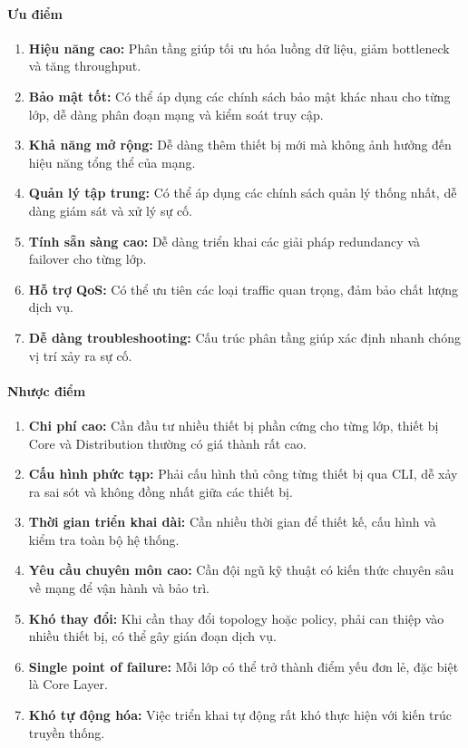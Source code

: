 \paragraph{Ưu điểm}
\begin{enumerate}
    \item \textbf{Hiệu năng cao:} Phân tầng giúp tối ưu hóa luồng dữ liệu, giảm bottleneck và tăng throughput.
    \item \textbf{Bảo mật tốt:} Có thể áp dụng các chính sách bảo mật khác nhau cho từng lớp, dễ dàng phân đoạn mạng và kiểm soát truy cập.
    \item \textbf{Khả năng mở rộng:} Dễ dàng thêm thiết bị mới mà không ảnh hưởng đến hiệu năng tổng thể của mạng.
    \item \textbf{Quản lý tập trung:} Có thể áp dụng các chính sách quản lý thống nhất, dễ dàng giám sát và xử lý sự cố.
    \item \textbf{Tính sẵn sàng cao:} Dễ dàng triển khai các giải pháp redundancy và failover cho từng lớp.
    \item \textbf{Hỗ trợ QoS:} Có thể ưu tiên các loại traffic quan trọng, đảm bảo chất lượng dịch vụ.
    \item \textbf{Dễ dàng troubleshooting:} Cấu trúc phân tầng giúp xác định nhanh chóng vị trí xảy ra sự cố.
\end{enumerate}

\paragraph{Nhược điểm}
\begin{enumerate}
    \item \textbf{Chi phí cao:} Cần đầu tư nhiều thiết bị phần cứng cho từng lớp, thiết bị Core và Distribution thường có giá thành rất cao.
    \item \textbf{Cấu hình phức tạp:} Phải cấu hình thủ công từng thiết bị qua CLI, dễ xảy ra sai sót và không đồng nhất giữa các thiết bị.
    \item \textbf{Thời gian triển khai dài:} Cần nhiều thời gian để thiết kế, cấu hình và kiểm tra toàn bộ hệ thống.
    \item \textbf{Yêu cầu chuyên môn cao:} Cần đội ngũ kỹ thuật có kiến thức chuyên sâu về mạng để vận hành và bảo trì.
    \item \textbf{Khó thay đổi:} Khi cần thay đổi topology hoặc policy, phải can thiệp vào nhiều thiết bị, có thể gây gián đoạn dịch vụ.
    \item \textbf{Single point of failure:} Mỗi lớp có thể trở thành điểm yếu đơn lẻ, đặc biệt là Core Layer.
    \item \textbf{Khó tự động hóa:} Việc triển khai tự động rất khó thực hiện với kiến trúc truyền thống.
\end{enumerate}

